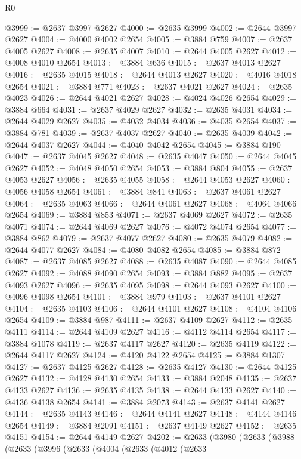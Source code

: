 \begin{lexlean}{R0}
\begin{coremodule}
@3999 := @2637 @3997 @2627
@4000 := @2635 @3999
@4002 := @2644 @3997 @2627
@4004 := @4000 @4002 @2654
@4005 := @3884 @759
@4007 := @2637 @4005 @2627
@4008 := @2635 @4007
@4010 := @2644 @4005 @2627
@4012 := @4008 @4010 @2654
@4013 := @3884 @636
@4015 := @2637 @4013 @2627
@4016 := @2635 @4015
@4018 := @2644 @4013 @2627
@4020 := @4016 @4018 @2654
@4021 := @3884 @771
@4023 := @2637 @4021 @2627
@4024 := @2635 @4023
@4026 := @2644 @4021 @2627
@4028 := @4024 @4026 @2654
@4029 := @3884 @664
@4031 := @2637 @4029 @2627
@4032 := @2635 @4031
@4034 := @2644 @4029 @2627
@4035 := @4032 @4034
@4036 := @4035 @2654
@4037 := @3884 @781
@4039 := @2637 @4037 @2627
@4040 := @2635 @4039
@4042 := @2644 @4037 @2627
@4044 := @4040 @4042 @2654
@4045 := @3884 @190
@4047 := @2637 @4045 @2627
@4048 := @2635 @4047
@4050 := @2644 @4045 @2627
@4052 := @4048 @4050 @2654
@4053 := @3884 @804
@4055 := @2637 @4053 @2627
@4056 := @2635 @4055
@4058 := @2644 @4053 @2627
@4060 := @4056 @4058 @2654
@4061 := @3884 @841
@4063 := @2637 @4061 @2627
@4064 := @2635 @4063
@4066 := @2644 @4061 @2627
@4068 := @4064 @4066 @2654
@4069 := @3884 @853
@4071 := @2637 @4069 @2627
@4072 := @2635 @4071
@4074 := @2644 @4069 @2627
@4076 := @4072 @4074 @2654
@4077 := @3884 @862
@4079 := @2637 @4077 @2627
@4080 := @2635 @4079
@4082 := @2644 @4077 @2627
@4084 := @4080 @4082 @2654
@4085 := @3884 @872
@4087 := @2637 @4085 @2627
@4088 := @2635 @4087
@4090 := @2644 @4085 @2627
@4092 := @4088 @4090 @2654
@4093 := @3884 @882
@4095 := @2637 @4093 @2627
@4096 := @2635 @4095
@4098 := @2644 @4093 @2627
@4100 := @4096 @4098 @2654
@4101 := @3884 @979
@4103 := @2637 @4101 @2627
@4104 := @2635 @4103
@4106 := @2644 @4101 @2627
@4108 := @4104 @4106 @2654
@4109 := @3884 @987
@4111 := @2637 @4109 @2627
@4112 := @2635 @4111
@4114 := @2644 @4109 @2627
@4116 := @4112 @4114 @2654
@4117 := @3884 @1078
@4119 := @2637 @4117 @2627
@4120 := @2635 @4119
@4122 := @2644 @4117 @2627
@4124 := @4120 @4122 @2654
@4125 := @3884 @1307
@4127 := @2637 @4125 @2627
@4128 := @2635 @4127
@4130 := @2644 @4125 @2627
@4132 := @4128 @4130 @2654
@4133 := @3884 @2048
@4135 := @2637 @4133 @2627
@4136 := @2635 @4135
@4138 := @2644 @4133 @2627
@4140 := @4136 @4138 @2654
@4141 := @3884 @2073
@4143 := @2637 @4141 @2627
@4144 := @2635 @4143
@4146 := @2644 @4141 @2627
@4148 := @4144 @4146 @2654
@4149 := @3884 @2091
@4151 := @2637 @4149 @2627
@4152 := @2635 @4151
@4154 := @2644 @4149 @2627
@4202 := @2633
    (@3980
      (@2633
        (@3988
          (@2633
            (@3996
              (@2633
                (@4004
                  (@2633
                    (@4012
                      (@2633

\end{coremodule}
\end{lexlean}
